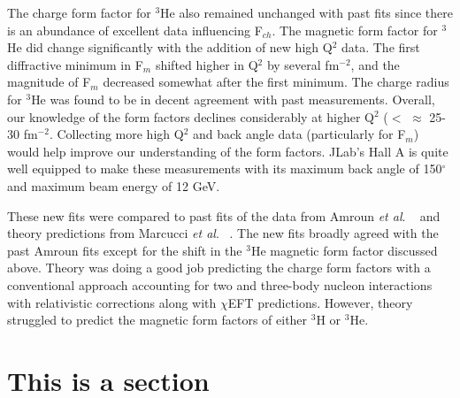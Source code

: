 The charge form factor for $^3$He also remained unchanged with past fits since there is an abundance of excellent data influencing F$_{ch}$. The magnetic form factor for $^3$He did change significantly with the addition of new high Q$^2$ data. The first diffractive minimum in F$_m$ shifted higher in Q$^2$ by several fm$^{-2}$, and the magnitude of F$_m$ decreased somewhat after the first minimum. The charge radius for $^3$He was found to be in decent agreement with past measurements. Overall, our knowledge of the form factors declines considerably at higher Q$^2$ ($<$ $\approx$ 25-30 fm$^{-2}$. Collecting more high Q$^2$ and back angle data (particularly for F$_m$) would help improve our understanding of the form factors. JLab's Hall A is quite well equipped to make these measurements with its maximum back angle of 150$^{\circ}$ and maximum beam energy of 12 GeV.

These new fits were compared to past fits of the data from Amroun \textit{et al}. ~\cite{Article:Amroun} and theory predictions from Marcucci \textit{et al}. ~\cite{Article:Marcucci}. The new fits broadly agreed with the past Amroun fits except for the shift in the $^3$He magnetic form factor discussed above. Theory was doing a good job predicting the charge form factors with a conventional approach accounting for two and three-body nucleon interactions with relativistic corrections along with $\chi$EFT predictions. However, theory struggled to predict the magnetic form factors of either $^3$H or $^3$He. 

\section{This is a section}
\label{•}